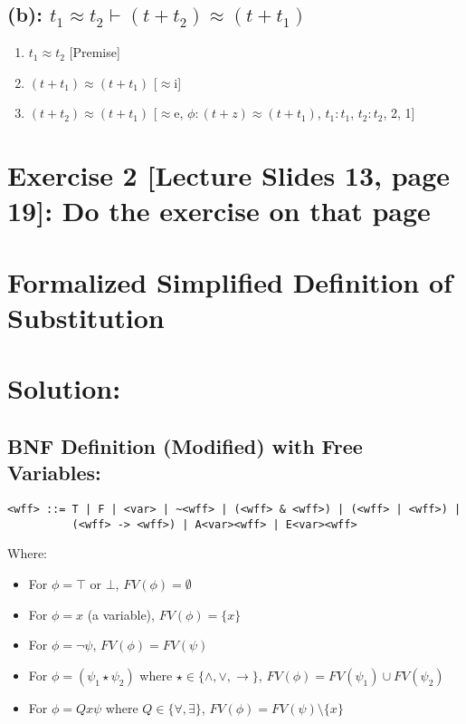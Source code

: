 \documentclass{article}
\newenvironment{proof}
{\begin{mdframed}[linewidth=0.5pt]\begin{enumerate}[label=\arabic*.,leftmargin=*]}
{\end{enumerate}\end{mdframed}}
\begin{document}
\newpage
\subsection*{(b): $t_1 \approx t_2 \vdash (t + t_2) \approx (t + t_1)$}

\begin{proof}
\item $t_1 \approx t_2$ \hfill [Premise]
\item $(t + t_1) \approx (t + t_1)$ \hfill [$\approx$i]
\item $(t + t_2) \approx (t + t_1)$ \hfill [$\approx$e, $\phi: (t + z) \approx (t + t_1)$, $t_1: t_1$, $t_2: t_2$, 2, 1]
\end{proof}


\newpage

\section*{Exercise 2 [Lecture Slides 13, page 19]: Do the exercise on that page}

\section*{Formalized Simplified Definition of Substitution}
\section*{Solution:}

\subsection*{ BNF Definition (Modified) with Free Variables:}

\begin{verbatim}
<wff> ::= T | F | <var> | ~<wff> | (<wff> & <wff>) | (<wff> | <wff>) | 
          (<wff> -> <wff>) | A<var><wff> | E<var><wff>
\end{verbatim}

Where:
\begin{itemize}
    \item For $\phi = \top$ or $\bot$, $FV(\phi) = \emptyset$
    \item For $\phi = x$ (a variable), $FV(\phi) = \{x\}$
    \item For $\phi = \neg\psi$, $FV(\phi) = FV(\psi)$
    \item For $\phi = (\psi_1 \star \psi_2)$ where $\star \in \{\wedge, \vee, \rightarrow\}$, $FV(\phi) = FV(\psi_1) \cup FV(\psi_2)$
    \item For $\phi = Qx \psi$ where $Q \in \{\forall, \exists\}$, $FV(\phi) = FV(\psi) \setminus \{x\}$
\end{itemize}
\end{document}
